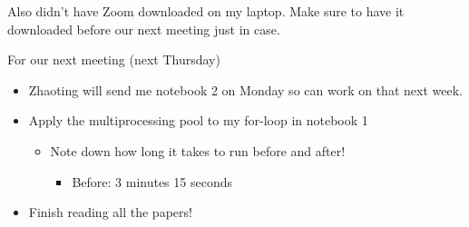 \item Also didn't have Zoom downloaded on my laptop.  Make sure to have it downloaded before our next meeting just in case.
\item For our next meeting (next Thursday)
\begin{itemize}
    \item Zhaoting will send me notebook 2 on Monday so can work on that next week.
    \item Apply the multiprocessing pool to my for-loop in notebook 1
    \begin{itemize}
        \item \color{red} Note down how long it takes to run before and after! \color{black}
        \begin{itemize}
            \item Before: 3 minutes 15 seconds
        \end{itemize}
    \end{itemize}
    \item Finish reading all the papers!
\end{itemize}